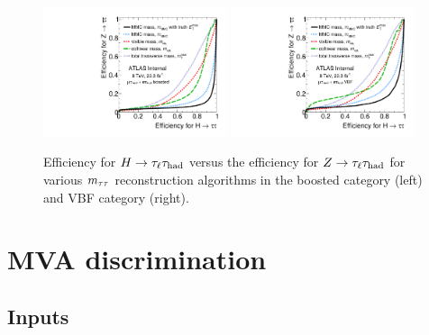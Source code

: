 \begin{figure}[tp]
  \centering
  \includegraphics[width=0.48\textwidth]{figures/mtautau/mtautau-boost}
  \includegraphics[width=0.48\textwidth]{figures/mtautau/mtautau-vbf}
  \caption{Efficiency for $H\rightarrow\tau_\ell\tau_\text{had}$ versus the efficiency for $Z\rightarrow\tau_\ell\tau_\text{had}$ for various $m_{\tau\tau}$ reconstruction algorithms in the boosted category (left) and VBF category (right).}
  \label{fig:strategy-mtautau-ROC}
\end{figure}

\section{MVA discrimination}
\label{sec:strategy-mva}

\subsection{Inputs}
\label{sec:strategy-mva-inputs}

